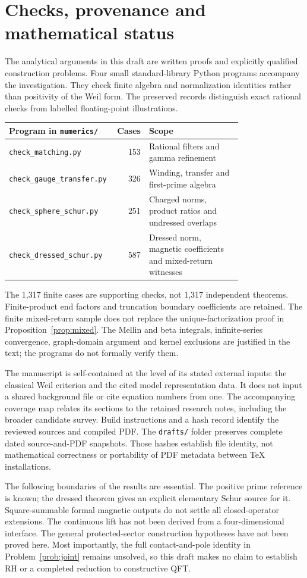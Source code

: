 \section{Checks, provenance and mathematical status}\label{app:checks}
The analytical arguments in this draft are written proofs and explicitly
qualified construction problems. Four small standard-library Python
programs accompany the investigation. They check finite algebra and
normalization identities rather than positivity of the Weil form.
The preserved records distinguish exact rational checks from labelled
floating-point illustrations.
\begin{center}
\small
\begin{tabular}{p{0.38\linewidth}rp{0.40\linewidth}}
\toprule
Program in \texttt{numerics/} & Cases & Scope \\
\midrule
\texttt{check\_matching.py} & 153 & Rational filters and gamma refinement \\
\texttt{check\_gauge\_transfer.py} & 326 & Winding, transfer and first-prime algebra \\
\texttt{check\_sphere\_schur.py} & 251 & Charged norms, product ratios and undressed overlaps \\
\texttt{check\_dressed\_schur.py} & 587 & Dressed norm, magnetic coefficients and mixed-return witnesses \\
\bottomrule
\end{tabular}
\end{center}
The 1,317 finite cases are supporting checks, not 1,317 independent
theorems. Finite-product end factors and truncation boundary
coefficients are retained. The finite mixed-return sample does not
replace the unique-factorization proof in Proposition~\ref{prop:mixed}.
The Mellin and beta integrals, infinite-series convergence,
graph-domain argument and kernel exclusions are justified in the text;
the programs do not formally verify them.

The manuscript is self-contained at the level of its stated external
inputs: the classical Weil criterion and the cited model representation
data. It does not input a shared background file or cite equation numbers
from one. The accompanying coverage map relates its sections to the
retained research notes, including the broader candidate survey.
Build instructions and a hash record identify the reviewed sources and
compiled PDF. The \texttt{drafts/} folder preserves complete dated
source-and-PDF snapshots. Those hashes establish file identity, not
mathematical correctness or portability of PDF metadata between TeX
installations.

The following boundaries of the results are essential. The positive
prime reference is known; the dressed theorem gives an explicit
elementary Schur source for it. Square-summable formal magnetic
outputs do not settle all closed-operator extensions. The continuous
lift has not been derived from a four-dimensional interface. The
general protected-sector construction hypotheses have not been
proved here. Most importantly, the full contact-and-pole identity
in Problem~\ref{prob:joint} remains unsolved, so this draft makes no
claim to establish RH or a completed reduction to constructive QFT.

